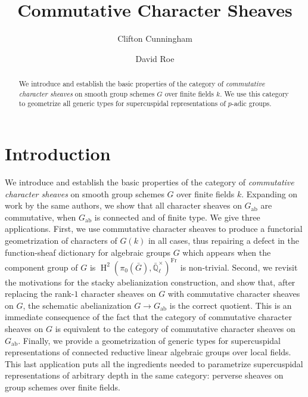 \documentclass[10pt]{amsart}
\title[Commutative Character Sheaves]{Commutative Character Sheaves}
\author{Clifton Cunningham}
\author{David Roe}
\theoremstyle{plain}
\theoremstyle{definition}
\newcommand{\EE}{\mathbb{\bar Q}_\ell}
\newcommand{\Fq}{k}
\newcommand{\EEx}{\EE^\times}
\newcommand{\Frob}[1]{\operatorname{Fr}_{#1}}
\DeclareMathOperator{\Hh}{H}
\newcommand{\ab}{_{\operatorname{ab}}}
\newcommand{\bG}{\bar{G}}
\begin{document}
\begin{abstract}
We introduce and establish the basic properties of  the category of \emph{commutative character sheaves} on smooth group schemes $G$ over finite fields $\Fq$. 
We use this category to geometrize all generic types for supercuspidal representations of $p$-adic groups. 
\end{abstract}

\maketitle

\tableofcontents

\section*{Introduction}
We introduce and establish the basic properties of  the category of \emph{commutative character sheaves} on smooth group schemes $G$ over finite fields $\Fq$. 
Expanding on work by the same authors, we show that all character sheaves on $G\ab$ are commutative, when $G\ab$ is connected and of finite type.
We give three applications.
First, we use commutative character sheaves to produce a functorial geometrization of characters of $G(\Fq)$ in all cases, thus repairing a defect in the function-sheaf dictionary for algebraic groups $G$ which appears when the component group of $G$ is $\Hh^2(\pi_0(\bG),\EEx)^{\Frob{}}$ is non-trivial. 
Second, we revisit the motivations for the stacky abelianization construction, and show that, after replacing the rank-$1$ character sheaves on $G$ with commutative character sheaves on $G$, the schematic abelianization $G \to G\ab$ is the correct quotient.
This is an immediate consequence of the fact that the category of commutative character sheaves on $G$ is equivalent to the category of commutative character sheaves on $G\ab$. 
Finally, we provide a geometrization of generic types for supercuspidal representations of connected reductive linear algebraic groups over local fields.
This last application puts all the ingredients needed to parametrize supercuspidal representations of arbitrary depth in the same category: perverse sheaves on group schemes over finite fields.
\end{document}
